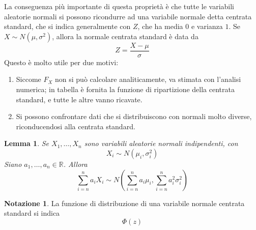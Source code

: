\documentclass{article}
\theoremstyle{plain}
\newtheorem{lemma}{Lemma}[section]
\theoremstyle{definition}
\newtheorem*{notazione}{Notazione}
\theoremstyle{remark}
\begin{document}
La conseguenza più importante di questa proprietà è che tutte le variabili aleatorie normali si possono ricondurre ad una variabile normale detta centrata standard, che si indica generalmente con $Z$, che ha media $0$ e varianza $1$. Se $X\sim N(\mu,\sigma^2)$, allora la normale centrata standard è data da
\begin{equation*}
	Z=\frac{X-\mu}{\sigma}
\end{equation*}
Questo è molto utile per due motivi:
\begin{enumerate}
	\item Siccome $F_X$ non si può calcolare analiticamente, va stimata con l'analisi numerica; in tabella è fornita la funzione di ripartizione della centrata standard, e tutte le altre vanno ricavate.
	\item Si possono confrontare dati che si distribuiscono con normali molto diverse, riconducendosi alla centrata standard.
\end{enumerate}
\begin{lemma}
	Se $X_1,\dots,X_n$ sono variabili aleatorie normali indipendenti, con
	\begin{equation*}
		X_i\sim N(\mu_i,\sigma_i^2)
	\end{equation*}
	Siano $a_1,\dots,a_n\in\mathds{R}$. Allora
	\begin{equation*}
		\sum_{i=n}^n a_iX_i\sim N(\sum_{i=n}^na_i\mu_i,\sum_{i=n}^na_i^2\sigma_i^2)
	\end{equation*}
\end{lemma}
\begin{notazione}
	La funzione di distribuzione di una variabile normale centrata standard si indica
	\begin{equation*}
		\Phi(z)
	\end{equation*}
\end{notazione}
\end{document}
